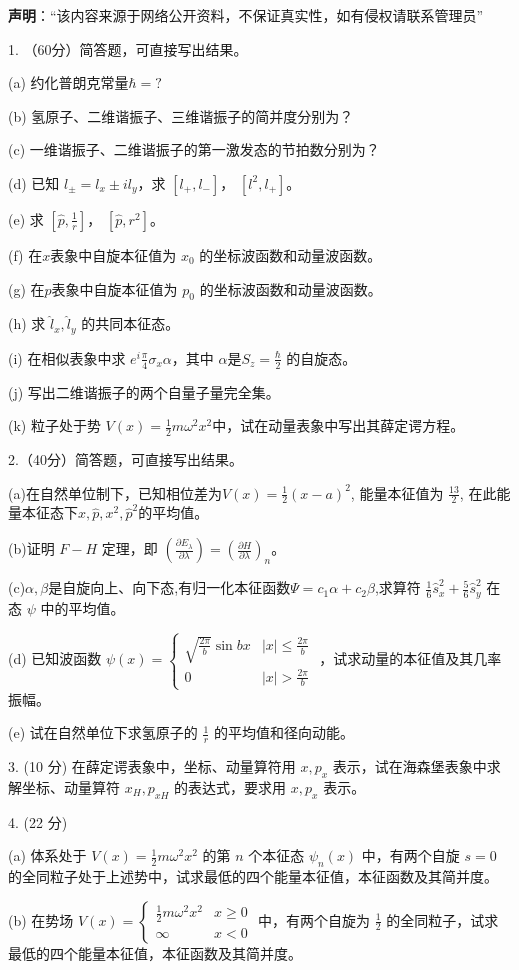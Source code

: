 
\textbf{声明}：“该内容来源于网络公开资料，不保证真实性，如有侵权请联系管理员”

1. （60分）简答题，可直接写出结果。

(a) 约化普朗克常量$\hbar = ?$

(b) 氢原子、二维谐振子、三维谐振子的简并度分别为？

(c) 一维谐振子、二维谐振子的第一激发态的节拍数分别为？

(d) 已知 $l_\pm = l_x \pm il_y $，求 $[l_+, l_-]$， $[l^2, l_+]$。

(e) 求 $[\hat p, \frac{1}{r}]$， $[\hat p, r^2]$。

(f) 在$x$表象中自旋本征值为 $x_0$ 的坐标波函数和动量波函数。

(g) 在$p$表象中自旋本征值为 $p_0$ 的坐标波函数和动量波函数。

(h) 求 $\hat l_x,\hat l_y$ 的共同本征态。

(i) 在相似表象中求 $e^i\frac{\pi}{4}\sigma_x\alpha$，其中 $\alpha$是$S_z =\frac{\hbar}{2} $ 的自旋态。

(j) 写出二维谐振子的两个自量子量完全集。

(k) 粒子处于势 $V(x) = \frac{1}{2}m\omega^2x^2$中，试在动量表象中写出其薛定谔方程。

2.（40分）简答题，可直接写出结果。

(a)在自然单位制下，已知相位差为$V(x) = \frac{1}{2} (x-a)^2$, 能量本征值为 $\frac{13}{2}$, 在此能量本征态下$x,\hat p,x^2,\hat p^2$的平均值。

(b)证明 $F-H$ 定理，即 
$\left( \frac{\partial E_{\lambda}}{\partial \lambda} \right) = \left( \frac{\partial H}{\partial \lambda} \right)_n$。

(c)$\alpha,\beta$是自旋向上、向下态,有归一化本征函数$\Psi=c_1\alpha+c_2\beta$,求算符 $\frac{1}{6}\hat s_x^2 + \frac{5}{6}\hat s_y^2$ 在态 $\psi$ 中的平均值。

(d) 已知波函数 $\psi(x) = 
\begin{cases} 
\sqrt{\frac{2\pi}{b}} \sin{bx} & |x| \leq \frac{2\pi}{b} \\
0 & |x| > \frac{2\pi}{b} 
\end{cases}$ ，试求动量的本征值及其几率振幅。

(e) 试在自然单位下求氢原子的 $\frac{1}{r}$ 的平均值和径向动能。

3. (10 分) 在薛定谔表象中，坐标、动量算符用 $x, p_x$ 表示，试在海森堡表象中求解坐标、动量算符 $x_H, p_{xH}$ 的表达式，要求用 $x, p_x$ 表示。

4. (22 分)

(a) 体系处于 $V(x) = \frac{1}{2}m\omega^2x^2$ 的第 $n$ 个本征态 $\psi_n(x)$ 中，有两个自旋 $s = 0$ 的全同粒子处于上述势中，试求最低的四个能量本征值，本征函数及其简并度。

(b) 在势场 $V(x) = 
\begin{cases} 
\frac{1}{2}m\omega^2x^2 & x \geq 0 \\
\infty & x < 0 
\end{cases}$ 中，有两个自旋为 $\frac{1}{2}$ 的全同粒子，试求最低的四个能量本征值，本征函数及其简并度。